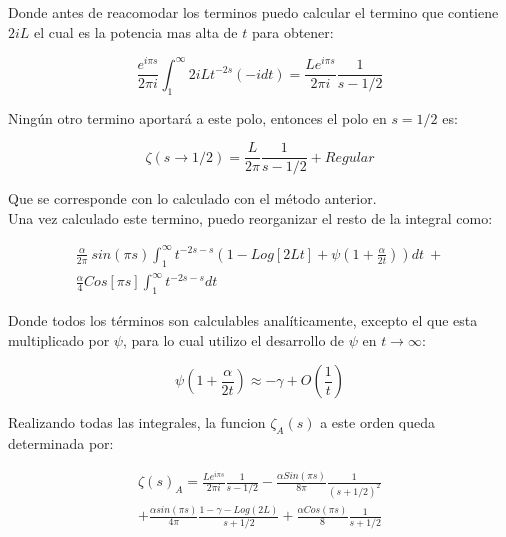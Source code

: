 Donde antes de reacomodar los terminos puedo calcular el termino que contiene $2iL$ el cual es la potencia mas alta de $t$ para obtener: 

\begin{equation}
    \frac{e^{i \pi s}}{2 \pi i }
    \int _1 ^{\infty}
    2 i L    
    t ^{-2 s}
    (-i dt) =  
    \frac{L e^{i \pi s} }{2 \pi i} \frac{1}{s-1/2   }
\end{equation}

Ningún otro termino aportará a este polo, entonces el polo en $s= 1/2$ es:

\begin{equation}
    \zeta  (s \rightarrow 1/2) = \frac{L}{2 \pi} \frac{1}{s- 1/2 } + Regular
\end{equation}

Que se corresponde con lo calculado con el método anterior. \\

Una vez calculado este termino, puedo reorganizar el resto de la integral como:

\begin{equation}
\begin{array}{c}
    \frac{\alpha}{2 \pi} \ sin(\pi s)
    \int _1 ^{\infty}
    t ^{-2 s-s} 
    \left(
    1 - Log[2Lt] + \psi (1 + \frac{\alpha}{2t})
    \right) dt \ + \\ 
    \frac{\alpha}{4} 
    Cos[\pi s]
    \int _1 ^{\infty} t^{-2s-s} dt
\end{array}
\end{equation}

Donde todos los términos son calculables analíticamente, excepto el que esta multiplicado por $\psi$, para lo cual utilizo el desarrollo de $\psi$ en $t \rightarrow \infty$:

\begin{equation}
    \psi(1 + \frac{\alpha}{2 t}) \approx 
    - \gamma + O \left( \frac{1}{t} \right)
\end{equation}

Realizando todas las integrales, la funcion $ \zeta _A (s)$ a este orden queda determinada por:  

\begin{equation}
\begin{array}{c}
    \zeta (s) _{A} = 
    \frac{L e ^{i \pi s}}{2 \pi i} \frac{1}{s-1/2} 
    -\frac{\alpha Sin(\pi s)}{8 \pi} \frac{1}{(s+1/2) ^2} \\
    + \frac{\alpha sin (\pi s) }{4 \pi } \frac{1 - \gamma -  Log(2 L)}{s+1/2}
    + \frac{\alpha Cos(\pi s)}{8} \frac{1}{s+1/2}
    
\end{array}
\end{equation}


